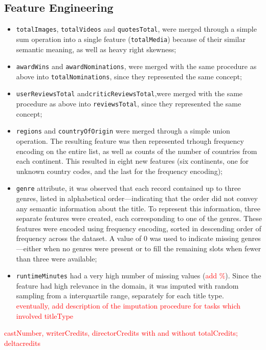 \subsection{Feature Engineering}
\begin{itemize}
    \item \texttt{totalImages}, \texttt{totalVideos} and \texttt{quotesTotal}, were merged
through a simple sum operation
into a single feature (\texttt{totalMedia}) because of their similar semantic
meaning, as well as heavy right skewness;
    \item \texttt{awardWins} and \texttt{awardNominations}, were merged with the same procedure
as above into \texttt{totalNominations}, since they represented the same concept;
    \item \texttt{userReviewsTotal} and\texttt{criticReviewsTotal},were merged with the same procedure
as above into \texttt{reviewsTotal}, since they represented the same concept;
    \item \texttt{regions} and \texttt{countryOfOrigin}
were merged through a simple union operation. The resulting feature was then
represented trhough frequency encoding on the entire list, as well as
counts of the number of countries from each continent.
This resulted in eight new features (six continents, one for unknown country codes,
and the last for the frequency encoding);
    \item \texttt{genre} attribute, it was observed that each record
contained up to three genres, listed in alphabetical order—indicating that the order
did not convey any semantic information about the title.
To represent this information, three separate features were created, each
corresponding to one of the genres. These features were encoded using frequency
encoding, sorted in descending order of frequency across the dataset.  
A value of 0 was used to indicate missing genres—either when no genres were present or
to fill the remaining slots when fewer than three were available;
    \item \texttt{runtimeMinutes} had a very high number of missing values (\textcolor{red}{add
\%}). Since the feature had high relevance in the domain, it was
imputed with random sampling from a interquartile range, separately for each title
type.\\
\textcolor{red}{eventually, add description of the imputation procedure for
tasks which involved titleType}


\end{itemize}

\textcolor{red}{castNumber, writerCredits, directorCredits with and without
totalCredits; deltacredits}\\

